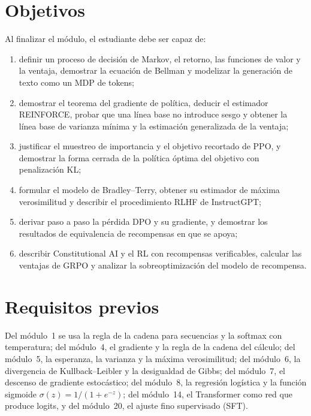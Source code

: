 \documentclass[11pt,a4paper,twoside,openany]{book}
\begin{document}
\section*{Objetivos}
Al finalizar el módulo, el estudiante debe ser capaz de:
\begin{enumerate}[label=\arabic*.]
  \item definir un proceso de decisión de Markov, el retorno, las funciones de valor y la ventaja, demostrar la ecuación de Bellman y modelizar la generación de texto como un MDP de tokens;
  \item demostrar el teorema del gradiente de política, deducir el estimador REINFORCE, probar que una línea base no introduce sesgo y obtener la línea base de varianza mínima y la estimación generalizada de la ventaja;
  \item justificar el muestreo de importancia y el objetivo recortado de PPO, y demostrar la forma cerrada de la política óptima del objetivo con penalización KL;
  \item formular el modelo de Bradley--Terry, obtener su estimador de máxima verosimilitud y describir el procedimiento RLHF de InstructGPT;
  \item derivar paso a paso la pérdida DPO y su gradiente, y demostrar los resultados de equivalencia de recompensas en que se apoya;
  \item describir Constitutional AI y el RL con recompensas verificables, calcular las ventajas de GRPO y analizar la sobreoptimización del modelo de recompensa.
\end{enumerate}

\section*{Requisitos previos}
Del módulo~1 se usa la regla de la cadena para secuencias y la softmax con temperatura; del módulo~4, el gradiente y la regla de la cadena del cálculo; del módulo~5, la esperanza, la varianza y la máxima verosimilitud; del módulo~6, la divergencia de Kullback--Leibler y la desigualdad de Gibbs; del módulo~7, el descenso de gradiente estocástico; del módulo~8, la regresión logística y la función sigmoide $\sigma(z)=1/(1+e^{-z})$; del módulo~14, el Transformer como red que produce logits, y del módulo~20, el ajuste fino supervisado (SFT).
\end{document}
